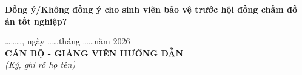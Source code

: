 \noindent
\textbf{Đồng ý/Không đồng ý cho sinh viên bảo vệ trước hội đồng chấm đồ án tốt nghiệp?}

\vspace{1.5cm}

\begin{flushright}
    \begin{minipage}{0.65\textwidth}
        \centering
        \ldots\ldots\ldots, ngày \ldots\ldots tháng \ldots\ldots năm 2026\\[0.8cm]
        \textbf{CÁN BỘ - GIẢNG VIÊN HƯỚNG DẪN}\\[0.2cm]
        \textit{(Ký, ghi rõ họ tên)}\\[2.5cm]
    \end{minipage}
\end{flushright}
